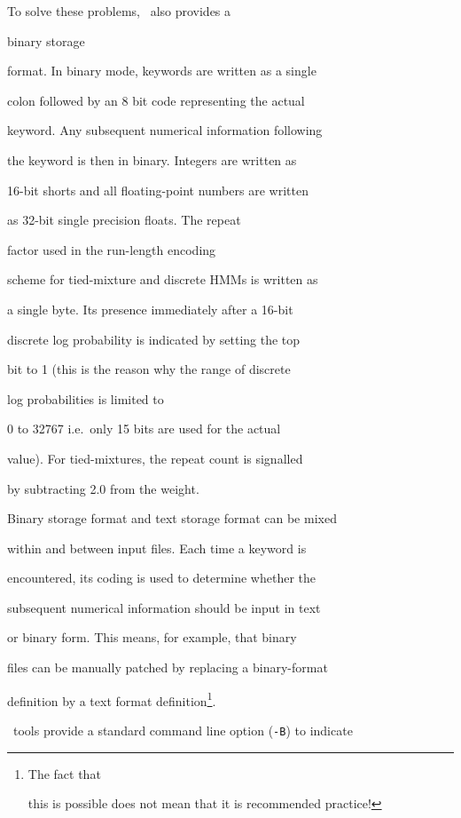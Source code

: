 To solve these problems, \HTK\ also provides a 


binary storage


format.  In binary mode, keywords are written as a single


colon followed by an 8 bit code representing the actual


keyword.  Any subsequent numerical information following


the keyword is then in binary.  Integers are written as


16-bit shorts and all floating-point numbers are written


as 32-bit single precision floats.  The repeat


factor used in the run-length encoding


scheme for tied-mixture and discrete HMMs is written as


a single byte.  Its presence immediately after a 16-bit


discrete log probability is indicated by setting the top


bit to 1 (this is the reason why the range of discrete 


log probabilities is limited to


0 to 32767 i.e.\ only 15 bits are used for the actual


value).  For tied-mixtures, the repeat count is signalled


by subtracting 2.0 from the weight.





Binary storage format and text storage format can be mixed


within and between input files.  Each time a keyword is


encountered, its coding is used to determine whether the


subsequent numerical information should be input in text


or binary form.  This means, for example, that binary


files can be manually patched by replacing a binary-format


definition by a text format definition\footnote{The fact that


this is possible does not mean that it is recommended practice!}.





\HTK\ tools provide a standard command line option (\texttt{-B}) to indicate


